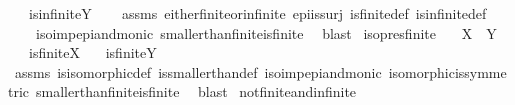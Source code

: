 \begin{isabellebody}
\ \ \ {\isachardoublequoteopen}is{\isacharunderscore}{\kern0pt}infinite{\isacharparenleft}{\kern0pt}Y{\isacharparenright}{\kern0pt}{\isachardoublequoteclose}\isanewline
%
\isadelimproof
\ \ %
\endisadelimproof
%
\isatagproof
{}\isamarkupfalse%
\ assms\ either{\isacharunderscore}{\kern0pt}finite{\isacharunderscore}{\kern0pt}or{\isacharunderscore}{\kern0pt}infinite\ epi{\isacharunderscore}{\kern0pt}is{\isacharunderscore}{\kern0pt}surj\ is{\isacharunderscore}{\kern0pt}finite{\isacharunderscore}{\kern0pt}def\ is{\isacharunderscore}{\kern0pt}infinite{\isacharunderscore}{\kern0pt}def\isanewline
\ \ \ \ iso{\isacharunderscore}{\kern0pt}imp{\isacharunderscore}{\kern0pt}epi{\isacharunderscore}{\kern0pt}and{\isacharunderscore}{\kern0pt}monic\ smaller{\isacharunderscore}{\kern0pt}than{\isacharunderscore}{\kern0pt}finite{\isacharunderscore}{\kern0pt}is{\isacharunderscore}{\kern0pt}finite\ \isamarkupfalse%
\ blast%
\endisatagproof
{\isafoldproof}%
%
\isadelimproof
\isanewline
%
\endisadelimproof
\isanewline
{}\isamarkupfalse%
\ iso{\isacharunderscore}{\kern0pt}pres{\isacharunderscore}{\kern0pt}finite{\isacharcolon}{\kern0pt}\isanewline
\ \ \ {\isachardoublequoteopen}X\ {\isasymcong}\ Y{\isachardoublequoteclose}\isanewline
\ \ \ {\isachardoublequoteopen}is{\isacharunderscore}{\kern0pt}finite{\isacharparenleft}{\kern0pt}X{\isacharparenright}{\kern0pt}{\isachardoublequoteclose}\isanewline
\ \ \ {\isachardoublequoteopen}is{\isacharunderscore}{\kern0pt}finite{\isacharparenleft}{\kern0pt}Y{\isacharparenright}{\kern0pt}{\isachardoublequoteclose}\isanewline
%
\isadelimproof
\ \ %
\endisadelimproof
%
\isatagproof
{}\isamarkupfalse%
\ assms\ is{\isacharunderscore}{\kern0pt}isomorphic{\isacharunderscore}{\kern0pt}def\ is{\isacharunderscore}{\kern0pt}smaller{\isacharunderscore}{\kern0pt}than{\isacharunderscore}{\kern0pt}def\ iso{\isacharunderscore}{\kern0pt}imp{\isacharunderscore}{\kern0pt}epi{\isacharunderscore}{\kern0pt}and{\isacharunderscore}{\kern0pt}monic\ isomorphic{\isacharunderscore}{\kern0pt}is{\isacharunderscore}{\kern0pt}symmetric\ smaller{\isacharunderscore}{\kern0pt}than{\isacharunderscore}{\kern0pt}finite{\isacharunderscore}{\kern0pt}is{\isacharunderscore}{\kern0pt}finite\ \isamarkupfalse%
\ blast%
\endisatagproof
{\isafoldproof}%
%
\isadelimproof
\isanewline
%
\endisadelimproof
\isanewline
{}\isamarkupfalse%
\ not{\isacharunderscore}{\kern0pt}finite{\isacharunderscore}{\kern0pt}and{\isacharunderscore}{\kern0pt}infinite{\isacharcolon}{\kern0pt}\isanewline

\end{isabellebody}
